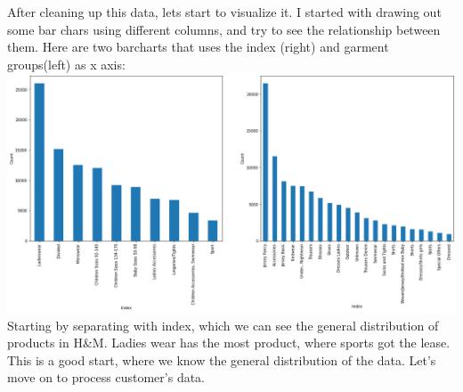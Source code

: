 \documentclass{article}
\begin{document}
After cleaning up this data, lets start to visualize it. I started with drawing out some bar chars using different columns, and try to see the relationship between them. Here are two barcharts that uses the index (right) and garment groups(left) as x axis:\\
\includegraphics[width=\textwidth]{barProduct}
\\
Starting by separating with index, which we can see the general distribution of products in H\&M. Ladies wear has the most product, where sports got the lease. This is a good start, where we know the general distribution of the data. Let's move on to process customer's data.
\end{document}
